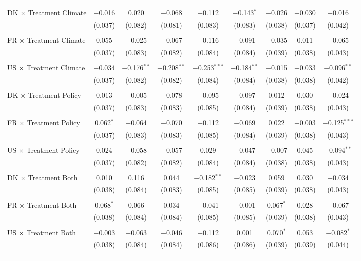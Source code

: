 \begin{tabular}{@{\extracolsep{5pt}}lcccccccc}
  & & & & & & & & \\ 
 DK $\times$ Treatment Climate & $-$0.016 & 0.020 & $-$0.068 & $-$0.112 & $-$0.143$^{*}$ & $-$0.026 & $-$0.030 & $-$0.016 \\ 
  & (0.037) & (0.082) & (0.081) & (0.083) & (0.083) & (0.038) & (0.037) & (0.042) \\ 
  & & & & & & & & \\ 
 FR $\times$ Treatment Climate & 0.055 & $-$0.025 & $-$0.067 & $-$0.116 & $-$0.091 & $-$0.035 & 0.011 & $-$0.065 \\ 
  & (0.037) & (0.083) & (0.082) & (0.084) & (0.084) & (0.039) & (0.038) & (0.043) \\ 
  & & & & & & & & \\ 
 US $\times$ Treatment Climate & $-$0.034 & $-$0.176$^{**}$ & $-$0.208$^{**}$ & $-$0.253$^{***}$ & $-$0.184$^{**}$ & $-$0.015 & $-$0.033 & $-$0.096$^{**}$ \\ 
  & (0.037) & (0.082) & (0.082) & (0.084) & (0.084) & (0.038) & (0.038) & (0.042) \\ 
  & & & & & & & & \\ 
 DK $\times$ Treatment Policy & 0.013 & $-$0.005 & $-$0.078 & $-$0.095 & $-$0.097 & 0.012 & 0.030 & $-$0.024 \\ 
  & (0.037) & (0.083) & (0.083) & (0.085) & (0.084) & (0.039) & (0.038) & (0.043) \\ 
  & & & & & & & & \\ 
 FR $\times$ Treatment Policy & 0.062$^{*}$ & $-$0.064 & $-$0.070 & $-$0.112 & $-$0.069 & 0.022 & $-$0.003 & $-$0.125$^{***}$ \\ 
  & (0.037) & (0.083) & (0.083) & (0.085) & (0.084) & (0.039) & (0.038) & (0.043) \\ 
  & & & & & & & & \\ 
 US $\times$ Treatment Policy & 0.024 & $-$0.058 & $-$0.057 & 0.029 & $-$0.047 & $-$0.007 & 0.045 & $-$0.094$^{**}$ \\ 
  & (0.037) & (0.082) & (0.082) & (0.084) & (0.084) & (0.038) & (0.038) & (0.043) \\ 
  & & & & & & & & \\ 
 DK $\times$ Treatment Both & 0.010 & 0.116 & 0.044 & $-$0.182$^{**}$ & $-$0.023 & 0.059 & 0.030 & $-$0.034 \\ 
  & (0.038) & (0.084) & (0.083) & (0.085) & (0.085) & (0.039) & (0.038) & (0.043) \\ 
  & & & & & & & & \\ 
 FR $\times$ Treatment Both & 0.068$^{*}$ & 0.066 & 0.034 & $-$0.041 & $-$0.001 & 0.067$^{*}$ & 0.028 & $-$0.067 \\ 
  & (0.038) & (0.084) & (0.084) & (0.085) & (0.085) & (0.039) & (0.038) & (0.043) \\ 
  & & & & & & & & \\ 
 US $\times$ Treatment Both & $-$0.003 & $-$0.063 & $-$0.046 & $-$0.112 & 0.001 & 0.070$^{*}$ & 0.053 & $-$0.082$^{*}$ \\ 
  & (0.038) & (0.084) & (0.084) & (0.086) & (0.086) & (0.039) & (0.039) & (0.044) \\ 
  & & & & & & & & \\ 
\hline \\[-1.8ex] 


\end{tabular}
